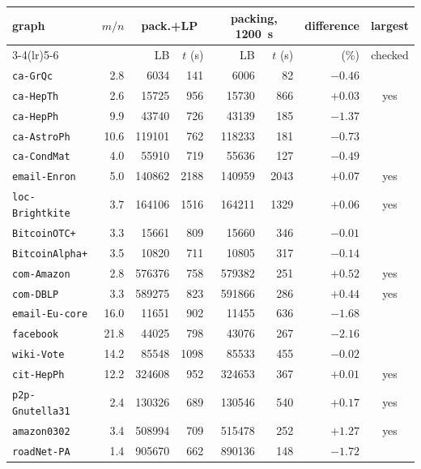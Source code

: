 \begin{tabular}{lrrrrrrc}
\toprule
graph & $m/n$ & \multicolumn{2}{c}{pack.+LP} & \multicolumn{2}{c}{packing, \SI{1200}{s}} & difference & largest \\
\cmidrule(lr){3-4}\cmidrule(lr){5-6}
 & & LB & $t$ (s) & LB & $t$ (s) & (\%) & checked \\
\midrule
\texttt{ca-GrQc} & 2.8 & \num{6034} & 141 & \num{6006} & 82 & $-0.46$ &  \\
\texttt{ca-HepTh} & 2.6 & \num{15725} & 956 & \num{15730} & 866 & $+0.03$ & yes \\
\texttt{ca-HepPh} & 9.9 & \num{43740} & 726 & \num{43139} & 185 & $-1.37$ &  \\
\texttt{ca-AstroPh} & 10.6 & \num{119101} & 762 & \num{118233} & 181 & $-0.73$ &  \\
\texttt{ca-CondMat} & 4.0 & \num{55910} & 719 & \num{55636} & 127 & $-0.49$ &  \\
\texttt{email-Enron} & 5.0 & \num{140862} & 2188 & \num{140959} & 2043 & $+0.07$ & yes \\
\texttt{loc-Brightkite} & 3.7 & \num{164106} & 1516 & \num{164211} & 1329 & $+0.06$ & yes \\
\texttt{BitcoinOTC+} & 3.3 & \num{15661} & 809 & \num{15660} & 346 & $-0.01$ &  \\
\texttt{BitcoinAlpha+} & 3.5 & \num{10820} & 711 & \num{10805} & 317 & $-0.14$ &  \\
\texttt{com-Amazon} & 2.8 & \num{576376} & 758 & \num{579382} & 251 & $+0.52$ & yes \\
\texttt{com-DBLP} & 3.3 & \num{589275} & 823 & \num{591866} & 286 & $+0.44$ & yes \\
\midrule
\texttt{email-Eu-core} & 16.0 & \num{11651} & 902 & \num{11455} & 636 & $-1.68$ &  \\
\texttt{facebook} & 21.8 & \num{44025} & 798 & \num{43076} & 267 & $-2.16$ &  \\
\texttt{wiki-Vote} & 14.2 & \num{85548} & 1098 & \num{85533} & 455 & $-0.02$ &  \\
\texttt{cit-HepPh} & 12.2 & \num{324608} & 952 & \num{324653} & 367 & $+0.01$ & yes \\
\texttt{p2p-Gnutella31} & 2.4 & \num{130326} & 689 & \num{130546} & 540 & $+0.17$ & yes \\
\texttt{amazon0302} & 3.4 & \num{508994} & 709 & \num{515478} & 252 & $+1.27$ & yes \\
\texttt{roadNet-PA} & 1.4 & \num{905670} & 662 & \num{890136} & 148 & $-1.72$ &  \\
\bottomrule
\end{tabular}
